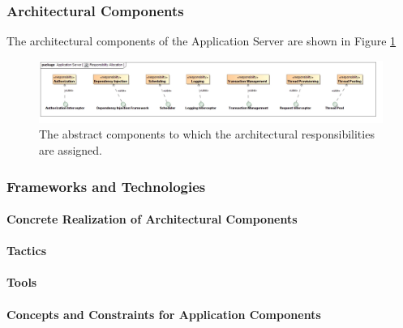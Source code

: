 \subsubsection{Architectural Components}
The architectural components of the Application Server are shown in Figure \ref{fig:applicationServerResponsibilityAllocation}
\begin{figure}[H]
	\begin{center}
	\includegraphics[scale=0.4]{../Diagrams and Charts/Application Server/ResponsibilityAllocation.jpg}
	\caption{The abstract components to which the architectural responsibilities are assigned.}
	\label{fig:applicationServerResponsibilityAllocation}
	\end{center}
\end{figure}

\subsubsection{Frameworks and Technologies}
\paragraph{Concrete Realization of Architectural Components}
\paragraph{Tactics}
\paragraph{Tools}
\paragraph{Concepts and Constraints for Application Components}